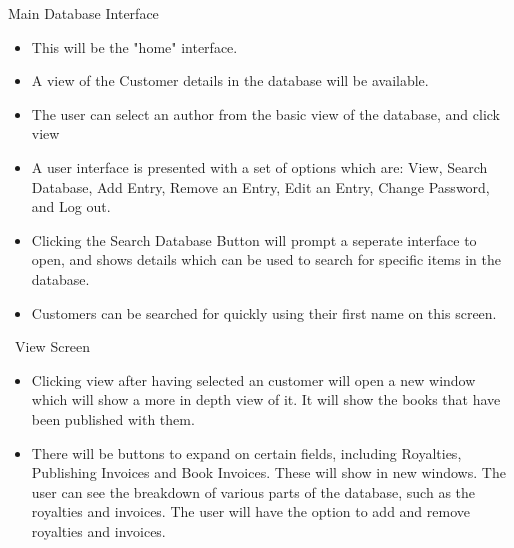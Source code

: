Main Database Interface
\begin{itemize}
    \item This will be the "home" interface.
    \item A view of the Customer details in the database will be available.
    \item The user can select an author from the basic view of the database, and click view
    \item A user interface is presented with a set of options which are: View, Search Database, Add Entry, Remove an Entry, Edit an Entry, Change Password, and Log out.
    \item Clicking the Search Database Button will prompt a seperate interface to open, and shows details which can be used to search for specific items in the database.
    \item Customers can be searched for quickly using their first name on this screen.
\end{itemize}

\
View Screen
\begin{itemize}
    \item Clicking view after having selected an customer will open a new window which will show a more in depth view of it. It will show the books that have been published with them.
    \item There will be buttons to expand on certain fields, including Royalties, Publishing Invoices and Book Invoices. These will show in new windows. The user can see the breakdown of various parts of the database, such as the royalties and invoices. The user will have the option to add and remove royalties and invoices.

\end{itemize}

\

